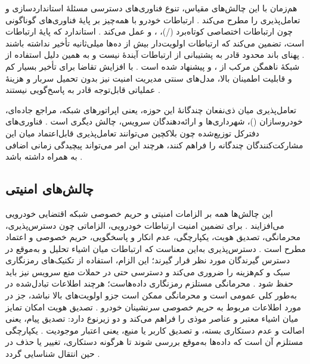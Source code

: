 هم‌زمان با این چالش‌های مقیاس، تنوع فناوری‌های دسترسی مسئلهٔ استانداردسازی و تعامل‌پذیری را مطرح می‌کند \cite{farsimadanReviewSecurityChallenges2025}. ارتباطات خودرو با همه‌چیز  بر پایهٔ فناوری‌های گوناگونی چون ارتباطات اختصاصی کوتاه‌برد (/)، ،  و  عمل می‌کند \cite{farsimadanReviewSecurityChallenges2025}. استاندارد  که پایهٔ ارتباطات  است، تضمین می‌کند که ارتباطات اولویت‌دار بیش از ده‌ها میلی‌ثانیه تأخیر نداشته باشند \cite{farsimadanReviewSecurityChallenges2025}. پهنای باند محدود  قادر به پشتیبانی از ارتباطات آیندهٔ  نیست \cite{farsimadanReviewSecurityChallenges2025} و به همین دلیل استفاده از شبکهٔ ناهمگن  مرکب از ،  و  پیشنهاد شده است \cite{farsimadanReviewSecurityChallenges2025}. با افزایش تقاضا برای تأخیر بسیار کم و قابلیت اطمینان بالا، مدل‌های سنتی مدیریت امنیت نیز بدون تحمیل سربار و هزینهٔ عملیاتی قابل‌توجه قادر به پاسخ‌گویی نیستند \cite{farsimadanReviewSecurityChallenges2025}.

تعامل‌پذیری میان ذی‌نفعان چندگانهٔ این حوزه، یعنی اپراتورهای شبکه، مراجع جاده‌ای، خودروسازان ()، شهرداری‌ها و ارائه‌دهندگان سرویس، چالش دیگری است \cite{farsimadanReviewSecurityChallenges2025}. فناوری‌های دفترکل توزیع‌شده چون بلاکچین می‌توانند تعامل‌پذیری قابل‌اعتماد میان این مشارکت‌کنندگان چندگانه را فراهم کنند، هرچند این امر می‌تواند پیچیدگی زمانی اضافی به همراه داشته باشد \cite{farsimadanReviewSecurityChallenges2025}.

\subsection{چالش‌های امنیتی}

این چالش‌ها همه بر الزامات امنیتی و حریم خصوصی شبکه اقتضایی خودرویی می‌افزایند \cite{farsimadanReviewSecurityChallenges2025, VanetSecurityPrivacy}. برای تضمین امنیت ارتباطات خودرویی، الزاماتی چون دسترس‌پذیری، محرمانگی، تصدیق هویت، یکپارچگی، عدم انکار و پاسخگویی، حریم خصوصی و اعتماد مطرح است \cite{farsimadanReviewSecurityChallenges2025, VanetSecurityPrivacy}. دسترس‌پذیری  به‌این معناست که ارتباطات میان اشیاء  تحلیل و به‌موقع در دسترس گیرندگان مورد نظر قرار گیرند؛ این الزام، استفاده از تکنیک‌های رمزنگاری سبک و کم‌هزینه را ضروری می‌کند و دسترسی حتی در حملات منع سرویس  نیز باید حفظ شود \cite{farsimadanReviewSecurityChallenges2025}. محرمانگی  مستلزم رمزنگاری داده‌هاست؛ هرچند اطلاعات تبادل‌شده در  به‌طور کلی عمومی است و محرمانگی ممکن است جزو اولویت‌های بالا نباشد، جز در مورد اطلاعات مربوط به حریم خصوصی سرنشینان خودرو \cite{farsimadanReviewSecurityChallenges2025}. تصدیق هویت  امکان تمایز میان اشیاء معتبر و عناصر موذی را فراهم می‌کند و دو زیرنوع دارد: تصدیق پیام، یعنی اصالت و عدم دستکاری بسته، و تصدیق کاربر یا منبع، یعنی اعتبار موجودیت \cite{farsimadanReviewSecurityChallenges2025}. یکپارچگی  مستلزم آن است که داده‌ها به‌موقع بررسی شوند تا هرگونه دستکاری، تغییر یا حذف در حین انتقال شناسایی گردد \cite{farsimadanReviewSecurityChallenges2025}.

